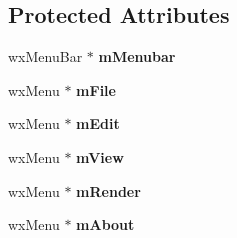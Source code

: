 \subsection*{Protected Attributes}
\begin{DoxyCompactItemize}
\item 
\hypertarget{classgui_parent_window_af2f991b37d9af429b073df263057955e}{
wxMenuBar $\ast$ {\bfseries mMenubar}}
\label{classgui_parent_window_af2f991b37d9af429b073df263057955e}

\item 
\hypertarget{classgui_parent_window_a21293214b7644a38f86f69df9e4cdb64}{
wxMenu $\ast$ {\bfseries mFile}}
\label{classgui_parent_window_a21293214b7644a38f86f69df9e4cdb64}

\item 
\hypertarget{classgui_parent_window_a46c0a0c386413f3693052eee0fd6a82d}{
wxMenu $\ast$ {\bfseries mEdit}}
\label{classgui_parent_window_a46c0a0c386413f3693052eee0fd6a82d}

\item 
\hypertarget{classgui_parent_window_aac7769869130ac85c2ac19849b39f35a}{
wxMenu $\ast$ {\bfseries mView}}
\label{classgui_parent_window_aac7769869130ac85c2ac19849b39f35a}

\item 
\hypertarget{classgui_parent_window_a3a9d4824013a057400c7da42bdc5ba53}{
wxMenu $\ast$ {\bfseries mRender}}
\label{classgui_parent_window_a3a9d4824013a057400c7da42bdc5ba53}

\item 
\hypertarget{classgui_parent_window_a4fe823916bb5aff56ba8ee8d3de4d398}{
wxMenu $\ast$ {\bfseries mAbout}}
\label{classgui_parent_window_a4fe823916bb5aff56ba8ee8d3de4d398}

\end{DoxyCompactItemize}


